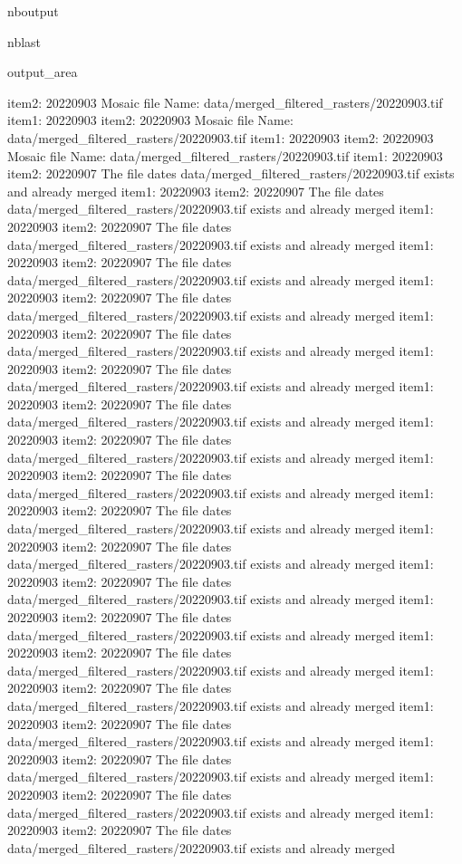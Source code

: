\documentclass[letterpaper,10pt]{sphinxmanual}
\begin{document}
\begin{sphinxuseclass}{nboutput}
\begin{sphinxuseclass}{nblast}
{\begin{sphinxuseclass}{output_area}
\begin{sphinxuseclass}{}
\begin{sphinxVerbatim}[commandchars=\\\{\}]
item2:  20220903
Mosaic file Name:  data/merged\_filtered\_rasters/20220903.tif
item1:  20220903
item2:  20220903
Mosaic file Name:  data/merged\_filtered\_rasters/20220903.tif
item1:  20220903
item2:  20220903
Mosaic file Name:  data/merged\_filtered\_rasters/20220903.tif
item1:  20220903
item2:  20220907
The file dates data/merged\_filtered\_rasters/20220903.tif exists and already merged
item1:  20220903
item2:  20220907
The file dates data/merged\_filtered\_rasters/20220903.tif exists and already merged
item1:  20220903
item2:  20220907
The file dates data/merged\_filtered\_rasters/20220903.tif exists and already merged
item1:  20220903
item2:  20220907
The file dates data/merged\_filtered\_rasters/20220903.tif exists and already merged
item1:  20220903
item2:  20220907
The file dates data/merged\_filtered\_rasters/20220903.tif exists and already merged
item1:  20220903
item2:  20220907
The file dates data/merged\_filtered\_rasters/20220903.tif exists and already merged
item1:  20220903
item2:  20220907
The file dates data/merged\_filtered\_rasters/20220903.tif exists and already merged
item1:  20220903
item2:  20220907
The file dates data/merged\_filtered\_rasters/20220903.tif exists and already merged
item1:  20220903
item2:  20220907
The file dates data/merged\_filtered\_rasters/20220903.tif exists and already merged
item1:  20220903
item2:  20220907
The file dates data/merged\_filtered\_rasters/20220903.tif exists and already merged
item1:  20220903
item2:  20220907
The file dates data/merged\_filtered\_rasters/20220903.tif exists and already merged
item1:  20220903
item2:  20220907
The file dates data/merged\_filtered\_rasters/20220903.tif exists and already merged
item1:  20220903
item2:  20220907
The file dates data/merged\_filtered\_rasters/20220903.tif exists and already merged
item1:  20220903
item2:  20220907
The file dates data/merged\_filtered\_rasters/20220903.tif exists and already merged
item1:  20220903
item2:  20220907
The file dates data/merged\_filtered\_rasters/20220903.tif exists and already merged
item1:  20220903
item2:  20220907
The file dates data/merged\_filtered\_rasters/20220903.tif exists and already merged
item1:  20220903
item2:  20220907
The file dates data/merged\_filtered\_rasters/20220903.tif exists and already merged
item1:  20220903
item2:  20220907
The file dates data/merged\_filtered\_rasters/20220903.tif exists and already merged
item1:  20220903
item2:  20220907
The file dates data/merged\_filtered\_rasters/20220903.tif exists and already merged
item1:  20220903
item2:  20220907
The file dates data/merged\_filtered\_rasters/20220903.tif exists and already merged

\end{sphinxVerbatim}
\end{sphinxuseclass}
\end{sphinxuseclass}}
\end{sphinxuseclass}
\end{sphinxuseclass}
\end{document}
